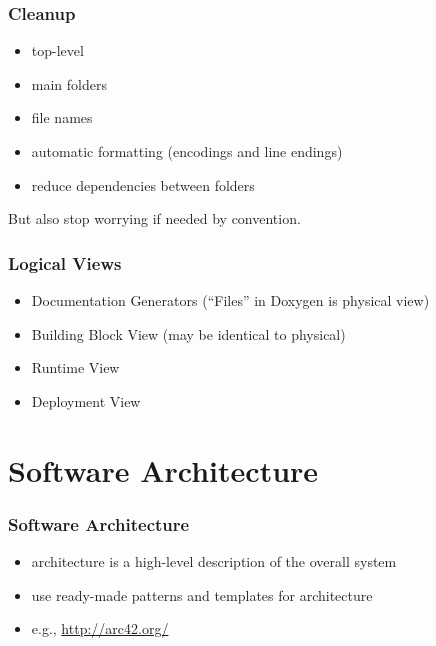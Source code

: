 \begin{frame}
	\frametitle{Cleanup}

	\begin{itemize}[<+-| alert@+>]
	\item top-level
	\item main folders
	\item file names
	\item automatic formatting (encodings and line endings)
	\item reduce dependencies between folders
	\end{itemize}

	\vspace{1cm}

	But also stop worrying if needed by convention.
\end{frame}

\begin{frame}
	\frametitle{Logical Views}

	\begin{itemize}[<+-| alert@+>]
	\item Documentation Generators (``Files'' in Doxygen is physical view)
	\item Building Block View (may be identical to physical)
	\item Runtime View
	\item Deployment View
	\end{itemize}
\end{frame}

\section{Software Architecture}

\begin{frame}
	\frametitle{Software Architecture}
	\begin{itemize}[<+-| alert@+>]
	\item architecture is a high-level description of the overall system
	\item use ready-made patterns and templates for architecture
	\item e.g., \url{http://arc42.org/}
	\end{itemize}
\end{frame}


